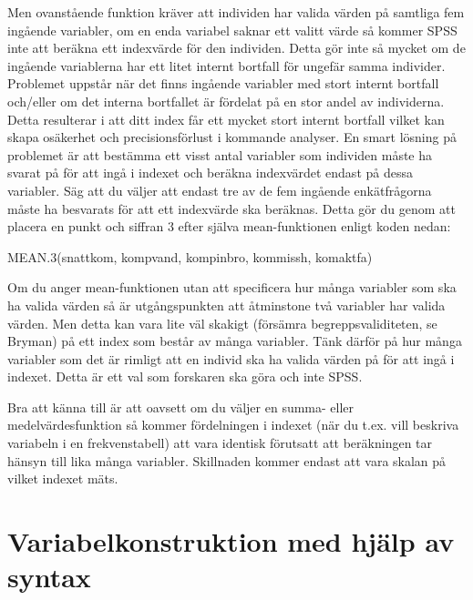 \documentclass[
]{book}
\newenvironment{Shaded}{\begin{snugshade}}{\end{snugshade}}
\newcommand{\FunctionTok}[1]{\textcolor[rgb]{0.00,0.00,0.00}{#1}}
\newcommand{\NormalTok}[1]{#1}
\begin{document}
Men ovanstående funktion kräver att individen har valida värden på samtliga fem ingående variabler,
om en enda variabel saknar ett valitt värde så kommer SPSS inte att beräkna ett indexvärde för den
individen. Detta gör inte så mycket om de ingående variablerna har ett litet internt bortfall för ungefär
samma individer. Problemet uppstår när det finns ingående variabler med stort internt bortfall och/eller
om det interna bortfallet är fördelat på en stor andel av individerna. Detta resulterar i att ditt index får
ett mycket stort internt bortfall vilket kan skapa osäkerhet och precisionsförlust i kommande analyser.
En smart lösning på problemet är att bestämma ett visst antal variabler som individen måste ha svarat
på för att ingå i indexet och beräkna indexvärdet endast på dessa variabler. Säg att du väljer att endast
tre av de fem ingående enkätfrågorna måste ha besvarats för att ett indexvärde ska beräknas. Detta gör
du genom att placera en punkt och siffran 3 efter själva mean-funktionen enligt koden nedan:

\begin{Shaded}
\begin{Highlighting}[]
\FunctionTok{MEAN.3}\NormalTok{(snattkom, kompvand, kompinbro, kommissh, komaktfa)}
\end{Highlighting}
\end{Shaded}

Om du anger mean-funktionen utan att specificera hur många variabler som ska ha valida värden så är
utgångspunkten att åtminstone två variabler har valida värden. Men detta kan vara lite väl skakigt
(försämra begreppsvaliditeten, se Bryman) på ett index som består av många variabler. Tänk därför på
hur många variabler som det är rimligt att en individ ska ha valida värden på för att ingå i indexet. Detta
är ett val som forskaren ska göra och inte SPSS.

Bra att känna till är att oavsett om du väljer en summa- eller medelvärdesfunktion så kommer
fördelningen i indexet (när du t.ex. vill beskriva variabeln i en frekvenstabell) att vara identisk förutsatt att beräkningen tar hänsyn till lika många variabler. Skillnaden kommer endast att vara skalan på vilket indexet mäts.

\hypertarget{variabelkonstruktion-med-hjuxe4lp-av-syntax}{%
\chapter{Variabelkonstruktion med hjälp av syntax}\label{variabelkonstruktion-med-hjuxe4lp-av-syntax}}
\end{document}
